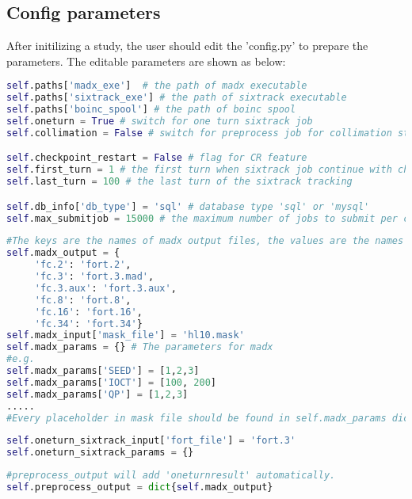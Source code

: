 \subsection{Config parameters}
After initilizing a study, the user should edit the 'config.py' to prepare the parameters.
The editable parameters are shown as below:
\begin{lstlisting}[language=Python]
self.paths['madx_exe']  # the path of madx executable
self.paths['sixtrack_exe'] # the path of sixtrack executable
self.paths['boinc_spool'] # the path of boinc spool
self.oneturn = True # switch for one turn sixtrack job
self.collimation = False # switch for preprocess job for collimation study (merge aperture marker into fort.2, generate fort3.limi file)

self.checkpoint_restart = False # flag for CR feature
self.first_turn = 1 # the first turn when sixtrack job continue with checkpoint file
self.last_turn = 100 # the last turn of the sixtrack tracking

self.db_info['db_type'] = 'sql' # database type 'sql' or 'mysql'
self.max_submitjob = 15000 # the maximum number of jobs to submit per cluster id
\end{lstlisting}

\begin{lstlisting}[language=Python]
#The keys are the names of madx output files, the values are the names of the input files needed by sixtrack. Due to they have the different naming covention, so there is an additional step to change the names of the files based on key-value map.
self.madx_output = {
     'fc.2': 'fort.2',
     'fc.3': 'fort.3.mad',
     'fc.3.aux': 'fort.3.aux',
     'fc.8': 'fort.8',
     'fc.16': 'fort.16',
     'fc.34': 'fort.34'}
self.madx_input['mask_file'] = 'hl10.mask'
self.madx_params = {} # The parameters for madx
#e.g.
self.madx_params['SEED'] = [1,2,3]
self.madx_params['IOCT'] = [100, 200]
self.madx_params['QP'] = [1,2,3]
.....
#Every placeholder in mask file should be found in self.madx_params dict.
\end{lstlisting}

\begin{lstlisting}[language=Python]
self.oneturn_sixtrack_input['fort_file'] = 'fort.3'
self.oneturn_sixtrack_params = {}
\end{lstlisting}

\begin{lstlisting}[language=Python]
#preprocess_output will add 'oneturnresult' automatically.
self.preprocess_output = dict{self.madx_output}
\end{lstlisting}

